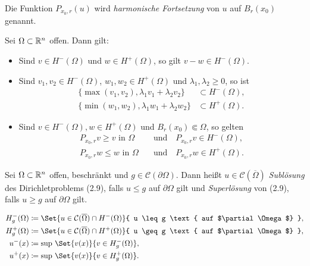 \documentclass{cheat-sheet}
\begin{document}
\begin{bem}
  Die Funktion $P_{x_0,r}(u)$ wird \emph{harmonische Fortsetzung} von $u$ auf $B_r(x_0)$ genannt.
\end{bem}

\begin{lem}
  Sei $\Omega \subset \mathbb{R}^n$ offen. Dann gilt:
  \begin{itemize}
    \item Sind $v \in H^-(\Omega)$ und $w \in H^+(\Omega)$, so gilt $v - w \in H^-(\Omega)$.
    \item Sind $v_1, v_2 \in H^-(\Omega)$, $w_1, w_2 \in H^+(\Omega)$ und $\lambda_1, \lambda_2 \geq 0$, so ist
    \begin{align*}
      \{ \max(v_1, v_2), \lambda_1 v_1 + \lambda_2 v_2 \} &\subset H^-(\Omega),\\
      \{ \min(w_1, w_2), \lambda_1 w_1 + \lambda_2 w_2 \} &\subset H^+(\Omega).
    \end{align*}
    \item Sind $v \in H^-(\Omega), w \in H^+(\Omega)$ und $B_r(x_0) \Subset \Omega$, so gelten
    \begin{align*}
      P_{x_0,r} v \geq v \text{ in $\Omega$} \quad &\text{und} \quad P_{x_0,r} v \in H^-(\Omega),\\
      P_{x_0,r} w \leq w \text{ in $\Omega$} \quad &\text{und} \quad P_{x_0,r} w \in H^+(\Omega).
    \end{align*}
  \end{itemize}
\end{lem}

\begin{defn}
  Sei $\Omega \subset \mathbb{R}^n$ offen, beschränkt und $g \in \mathcal{C}(\partial \Omega)$. Dann heißt $u \in \mathcal{C}(\overline{\Omega})$ \emph{Sublösung} des Dirichletproblems (2.9), falls $u \leq g$ auf $\partial \Omega$ gilt und \emph{Superlösung} von (2.9), falls $u \geq g$ auf $\partial \Omega$ gilt.
\end{defn}

\begin{nota}
  \begin{minipage}[t]{0.7 \linewidth}
    \vspace{-15pt}
    \begin{align*}
      H_g^-(\Omega) &\coloneqq \Set{ u \in \mathcal{C}(\overline{\Omega}) \cap H^-(\Omega) }{ u \leq g \text{ auf $\partial \Omega$} },\\
      H_g^+(\Omega) &\coloneqq \Set{ u \in \mathcal{C}(\overline{\Omega}) \cap H^+(\Omega) }{ u \geq g \text{ auf $\partial \Omega$} },\\
      u^-(x) &\coloneqq \sup\,\Set{ v(x) }{ v \in H_g^-(\Omega) },\\
      u^+(x) &\coloneqq \sup\,\Set{ v(x) }{ v \in H_g^+(\Omega) }.
    \end{align*}
  \end{minipage}
\end{nota}
\end{document}
